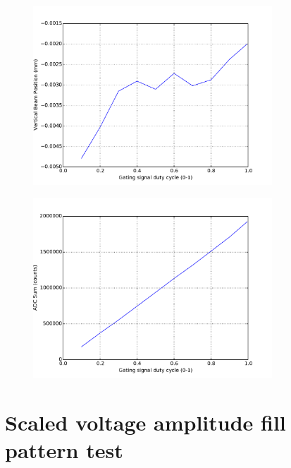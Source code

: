 \documentclass[a4paper, 11pt]{article}%
\begin{document}
%


\begin{figure}[htbp]%
\centering%
\includegraphics[width=0.8\textwidth]{./Results/DC_vs_Y.pdf}%
\caption{}%
\end{figure}

%


\begin{figure}[htbp]%
\centering%
\includegraphics[width=0.8\textwidth]{./Results/DC_vs_ADC_sum.pdf}%
\caption{}%
\end{figure}

%
\clearpage%
\section{Scaled voltage amplitude fill pattern test}%
\end{document}
